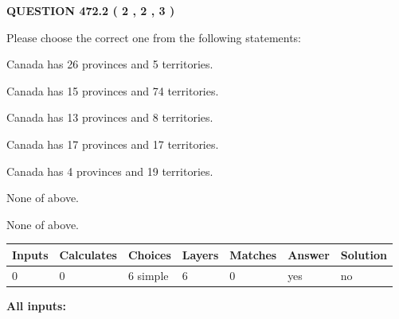 \documentclass[12pt]{article}
\begin{document}
   
  
\vspace{0.2in}
  
{\textbf{\Large{QUESTION
472.2 
 ( 2 , 2 , 3 )
}}}
  
  
Please choose the correct one from the following statements:
 
 
Canada has  26 provinces and  5 territories.
 
 
Canada has  15 provinces and  74 territories.
 
 
Canada has  13 provinces and  8 territories.
 
 
Canada has  17 provinces and  17 territories.
 
 
Canada has   4 provinces and  19 territories.
 
 
 None of above.
 
 
\noindent{}
 
 
 None of above.
 
 
\noindent{}
 
 
   
   
   
   
\noindent\begin{tabular}{|l|l|l|l|l|l|l|}
 \hline
Inputs & Calculates & Choices & Layers & Matches & Answer & Solution \\ \hline
 0  & 
 0  & 
 6
  simple  
  & 
 6  & 
 0  & 
  yes & 
  no 
  \\ \hline
 \end{tabular}
   
   
   
   
\noindent{}
   
   
   
   
\noindent\vspace{0.1in}\hspace{-0.08in} {\textbf{\Large{All inputs: }}}
   
   
   
   
   
   
 \vspace{0.2in}
 
\end{document}
